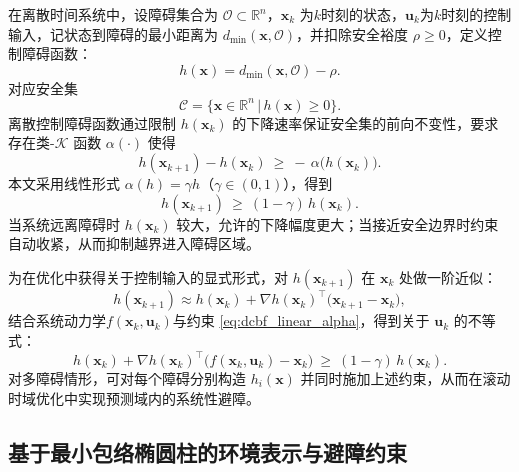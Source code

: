 在离散时间系统中，设障碍集合为 \(\mathcal{O}\subset\mathbb{R}^n\)，\(\mathbf{x}_k\) 为\(k\)时刻的状态，\(\mathbf{u}_k\)为\(k\)时刻的控制输入，记状态到障碍的最小距离为 \(d_{\min}(\mathbf{x},\mathcal{O})\)，并扣除安全裕度 \(\rho\ge 0\)，定义控制障碍函数：
\begin{equation}
h(\mathbf{x}) = d_{\min}(\mathbf{x},\mathcal{O})-\rho.
\label{eq:dcbf_h_def}
\end{equation}
对应安全集
\begin{equation}
\mathcal{C}=\big\{\mathbf{x}\in\mathbb{R}^n \,\big|\, h(\mathbf{x})\ge 0\big\}.
\label{eq:dcbf_safe_set}
\end{equation}
离散控制障碍函数通过限制 \(h(\mathbf{x}_k)\) 的下降速率保证安全集的前向不变性，要求存在类-\(\mathcal{K}\) 函数 \(\alpha(\cdot)\) 使得
\begin{equation}
h(\mathbf{x}_{k+1})-h(\mathbf{x}_k)\ \ge\ -\,\alpha\big(h(\mathbf{x}_k)\big).
\label{eq:dcbf_core}
\end{equation}
本文采用线性形式 \(\alpha(h)=\gamma h\)（\(\gamma\in(0,1)\)），得到
\begin{equation}
h(\mathbf{x}_{k+1})\ \ge\ (1-\gamma)\,h(\mathbf{x}_k).
\label{eq:dcbf_linear_alpha}
\end{equation}
当系统远离障碍时 \(h(\mathbf{x}_k)\) 较大，允许的下降幅度更大；当接近安全边界时约束自动收紧，从而抑制越界进入障碍区域。

为在优化中获得关于控制输入的显式形式，对 \(h(\mathbf{x}_{k+1})\) 在 \(\mathbf{x}_k\) 处做一阶近似：
\begin{equation}
h(\mathbf{x}_{k+1})\approx h(\mathbf{x}_k)+\nabla h(\mathbf{x}_k)^\top\!\big(\mathbf{x}_{k+1}-\mathbf{x}_k\big),
\label{eq:dcbf_first_order}
\end{equation}
结合系统动力学\(f(\mathbf{x}_k,\mathbf{u}_k)\)与约束 \autoref{eq:dcbf_linear_alpha}，得到关于 \(\mathbf{u}_k\) 的不等式：
\begin{equation}
h(\mathbf{x}_k)+\nabla h(\mathbf{x}_k)^\top\!\big(f(\mathbf{x}_k,\mathbf{u}_k)-\mathbf{x}_k\big)\ \ge\ (1-\gamma)\,h(\mathbf{x}_k).
\label{eq:dcbf_affine}
\end{equation}
对多障碍情形，可对每个障碍分别构造 \(h_i(\mathbf{x})\) 并同时施加上述约束，从而在滚动时域优化中实现预测域内的系统性避障。

\subsection{基于最小包络椭圆柱的环境表示与避障约束}\label{sec:cluster_dcbf}

